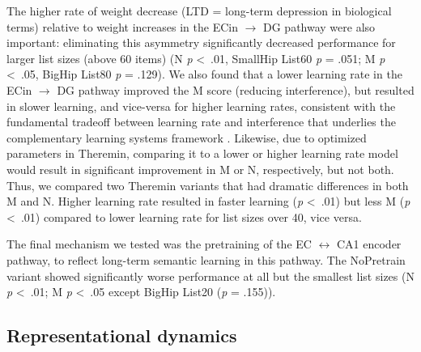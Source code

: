 \documentclass[11pt,twoside]{article}
\newif\myifpdf
\begin{document}
The higher rate of weight decrease (LTD = long-term depression in biological terms) relative to weight increases in the ECin $\rightarrow$ DG pathway were also important: eliminating this asymmetry significantly decreased performance for larger list sizes (above 60 items) (N \emph{p} \textless \ .01, SmallHip List60 \emph{p} = .051; M \emph{p} \textless \ .05, BigHip List80 \emph{p} = .129).  We also found that a lower learning rate in the ECin $\rightarrow$ DG pathway improved the M score (reducing interference), but resulted in slower learning, and vice-versa for higher learning rates, consistent with the fundamental tradeoff between learning rate and interference that underlies the complementary learning systems framework \citep{McClellandMcNaughtonOReilly95}.  Likewise, due to optimized parameters in Theremin, comparing it to a lower or higher learning rate model would result in significant improvement in M or N, respectively, but not both. Thus, we compared two Theremin variants that had dramatic differences in both M and N. Higher learning rate resulted in faster learning (\emph{p} \textless \ .01) but less M (\emph{p} \textless \ .01) compared to lower learning rate for list sizes over 40, vice versa.

The final mechanism we tested was the pretraining of the EC $\leftrightarrow$ CA1 encoder pathway, to reflect long-term semantic learning in this pathway.  The NoPretrain variant showed significantly worse performance at all but the smallest list sizes (N \emph{p} \textless \ .01; M \emph{p} \textless \ .05 except BigHip List20 (\emph{p} = .155)). 

\subsection{Representational dynamics}
\end{document}

